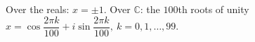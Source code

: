Over the reals: $x=\pm1$. Over $\mathbb C$: the $100$th roots of unity $\boxed{x=\cos\dfrac{2\pi k}{100}+i\sin\dfrac{2\pi k}{100},\ k=0,1,\dots,99}$.
